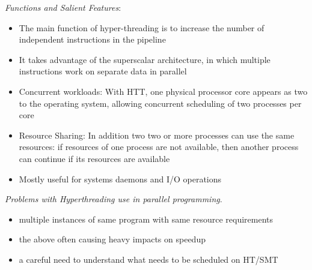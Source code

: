 \documentclass[12pt, a4paper]{report}
\begin{document}
{\textit{Functions and Salient Features}}:
\begin{itemize}
    \item The main function of hyper-threading is to increase the number of independent instructions in the pipeline
    \item It takes advantage of the superscalar architecture, in which multiple instructions work on separate data in
          parallel
    \item Concurrent workloads: With HTT, one physical processor core appears as two to the operating system, allowing 
          concurrent scheduling of two processes per core
    \item Resource Sharing: In addition two two or more processes can use the same resources: if resources of one 
          process are not available, then another process can continue if its resources are available
    \item Mostly useful for systems daemons and I/O operations
\end{itemize}

{\textit{Problems with Hyperthreading use in parallel programming}}. 
\begin{itemize}
    \item multiple instances of same program with same resource requirements
    \item the above often causing heavy impacts on speedup 
    \item a careful need to understand what needs to be scheduled on HT/SMT 
\end{itemize}
\end{document}
